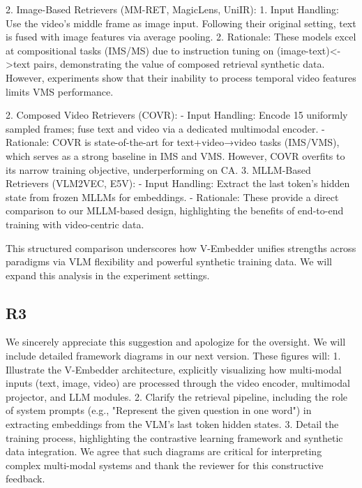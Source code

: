 \documentclass[11pt]{article}
\begin{document}
  2. Image-Based Retrievers (MM-RET, MagicLens, UniIR):  
    1. Input Handling: Use the video's middle frame as image input. Following their original setting, text is fused with image features via average pooling.
    2. Rationale: These models excel at compositional tasks (IMS/MS) due to instruction tuning on (image-text)<->text pairs, demonstrating the value of composed retrieval synthetic data. However, experiments show that their inability to process temporal video features limits VMS performance.  
    
2. Composed Video Retrievers (COVR):  
  - Input Handling: Encode 15 uniformly sampled frames; fuse text and video via a dedicated multimodal encoder.  
  - Rationale: COVR is state-of-the-art for text+video→video tasks (IMS/VMS), which serves as a strong baseline in IMS and VMS. However, COVR overfits to its narrow training objective, underperforming on CA.  
3. MLLM-Based Retrievers (VLM2VEC, E5V):  
  - Input Handling: Extract the last token's hidden state from frozen MLLMs for embeddings.  
  - Rationale: These provide a direct comparison to our MLLM-based design, highlighting the benefits of end-to-end training with video-centric data.  

This structured comparison underscores how V-Embedder unifies strengths across paradigms via VLM flexibility and powerful synthetic training data. We will expand this analysis in the experiment settings.


\subsection{R3}
We sincerely appreciate this suggestion and apologize for the oversight. We will include detailed framework diagrams in our next version. These figures will:
  1. Illustrate the V-Embedder architecture, explicitly visualizing how multi-modal inputs (text, image, video) are processed through the video encoder, multimodal projector, and LLM modules.
  2. Clarify the retrieval pipeline, including the role of system prompts (e.g., "Represent the given question in one word") in extracting embeddings from the VLM’s last token hidden states.
  3. Detail the training process, highlighting the contrastive learning framework and synthetic data integration.
We agree that such diagrams are critical for interpreting complex multi-modal systems  and thank the reviewer for this constructive feedback.
\end{document}

